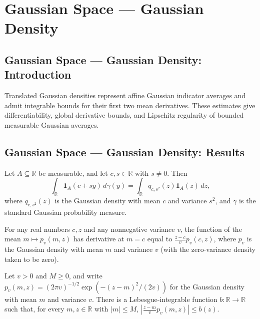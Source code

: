 \section{Gaussian Space --- Gaussian Density}
\subsection*{Gaussian Space --- Gaussian Density: Introduction}
Translated Gaussian densities represent affine Gaussian indicator averages and admit integrable bounds for their first two mean derivatives. These estimates give differentiability, global derivative bounds, and Lipschitz regularity of bounded measurable Gaussian averages.

\subsection*{Gaussian Space --- Gaussian Density: Results}

\begin{lemma}
\leanok
{}
Let $A\subseteq\mathbb R$ be measurable, and let $c,s\in\mathbb R$ with $s\ne0$. Then
\[
\int_{\mathbb R}\mathbf 1_A(c+sy)\,d\gamma(y)=\int_{\mathbb R} q_{c,s^2}(z)\mathbf
1_A(z)\,dz,
\]
where $q_{c,s^2}(z)$ is the Gaussian density with mean $c$ and variance $s^2$, and
$\gamma$ is the standard Gaussian probability measure.
\end{lemma}

\begin{lemma}
\leanok
{}
For any real numbers $c,z$ and any nonnegative variance $v$, the function of the mean
$m\mapsto p_v(m,z)$ has derivative at $m=c$ equal to $\frac{z-c}{v}p_v(c,z)$, where
$p_v$ is the Gaussian density with mean $m$ and variance $v$ (with the zero-variance
density taken to be zero).
\end{lemma}

\begin{lemma}
\leanok
{}
Let $v>0$ and $M\ge 0$, and write $p_v(m,z)=(2\pi v)^{-1/2}\exp(-(z-m)^2/(2v))$ for the
Gaussian density with mean $m$ and variance $v$. There is a Lebesgue-integrable function
$b:\mathbb R\to\mathbb R$ such that, for every $m,z\in\mathbb R$ with $|m|\le M$,
$\left|\frac{z-m}{v}p_v(m,z)\right|\le b(z)$.
\end{lemma}

